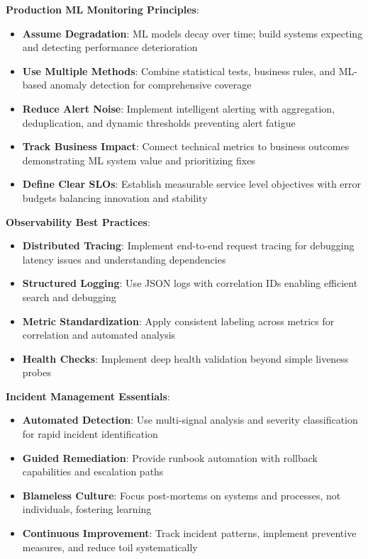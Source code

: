 \textbf{Production ML Monitoring Principles}:
\begin{itemize}
    \item \textbf{Assume Degradation}: ML models decay over time; build systems expecting and detecting performance deterioration
    \item \textbf{Use Multiple Methods}: Combine statistical tests, business rules, and ML-based anomaly detection for comprehensive coverage
    \item \textbf{Reduce Alert Noise}: Implement intelligent alerting with aggregation, deduplication, and dynamic thresholds preventing alert fatigue
    \item \textbf{Track Business Impact}: Connect technical metrics to business outcomes demonstrating ML system value and prioritizing fixes
    \item \textbf{Define Clear SLOs}: Establish measurable service level objectives with error budgets balancing innovation and stability
\end{itemize}

\textbf{Observability Best Practices}:
\begin{itemize}
    \item \textbf{Distributed Tracing}: Implement end-to-end request tracing for debugging latency issues and understanding dependencies
    \item \textbf{Structured Logging}: Use JSON logs with correlation IDs enabling efficient search and debugging
    \item \textbf{Metric Standardization}: Apply consistent labeling across metrics for correlation and automated analysis
    \item \textbf{Health Checks}: Implement deep health validation beyond simple liveness probes
\end{itemize}

\textbf{Incident Management Essentials}:
\begin{itemize}
    \item \textbf{Automated Detection}: Use multi-signal analysis and severity classification for rapid incident identification
    \item \textbf{Guided Remediation}: Provide runbook automation with rollback capabilities and escalation paths
    \item \textbf{Blameless Culture}: Focus post-mortems on systems and processes, not individuals, fostering learning
    \item \textbf{Continuous Improvement}: Track incident patterns, implement preventive measures, and reduce toil systematically
\end{itemize}

